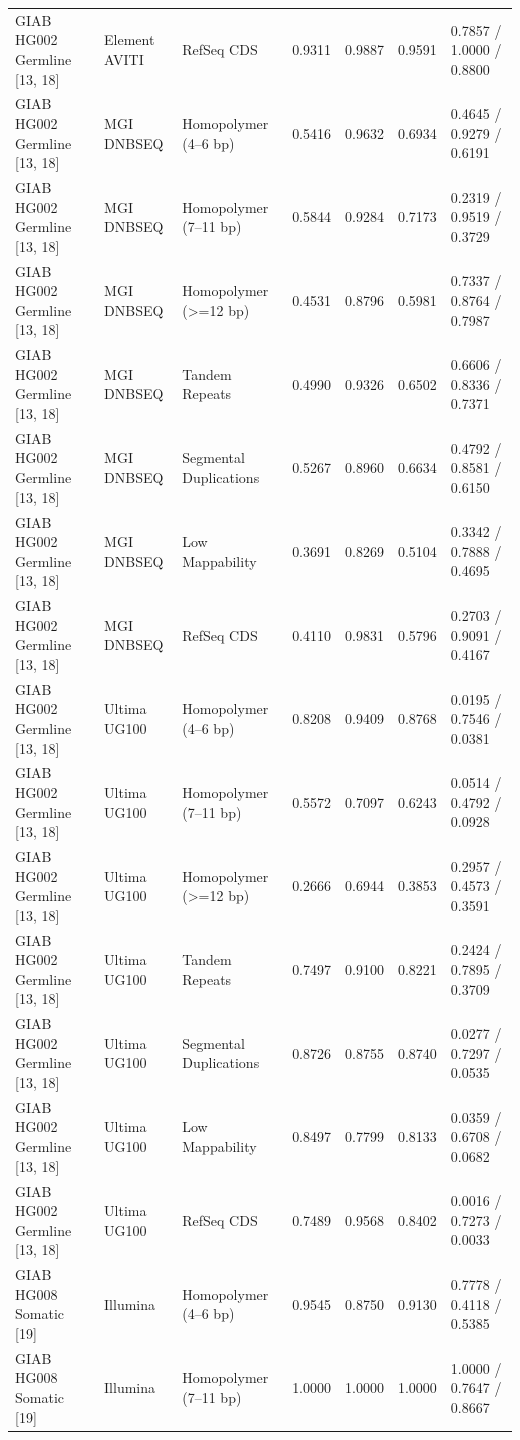\begin{table}[htbp]
{\begin{tabular}{lllllll}
GIAB HG002 Germline [13, 18] & Element AVITI & RefSeq CDS & 0.9311 & 0.9887 & 0.9591 & 0.7857 / 1.0000 / 0.8800 \\
GIAB HG002 Germline [13, 18] & MGI DNBSEQ & Homopolymer (4--6 bp) & 0.5416 & 0.9632 & 0.6934 & 0.4645 / 0.9279 / 0.6191 \\
GIAB HG002 Germline [13, 18] & MGI DNBSEQ & Homopolymer (7--11 bp) & 0.5844 & 0.9284 & 0.7173 & 0.2319 / 0.9519 / 0.3729 \\
GIAB HG002 Germline [13, 18] & MGI DNBSEQ & Homopolymer (\textgreater{}=12 bp) & 0.4531 & 0.8796 & 0.5981 & 0.7337 / 0.8764 / 0.7987 \\
GIAB HG002 Germline [13, 18] & MGI DNBSEQ & Tandem Repeats & 0.4990 & 0.9326 & 0.6502 & 0.6606 / 0.8336 / 0.7371 \\
GIAB HG002 Germline [13, 18] & MGI DNBSEQ & Segmental Duplications & 0.5267 & 0.8960 & 0.6634 & 0.4792 / 0.8581 / 0.6150 \\
GIAB HG002 Germline [13, 18] & MGI DNBSEQ & Low Mappability & 0.3691 & 0.8269 & 0.5104 & 0.3342 / 0.7888 / 0.4695 \\
GIAB HG002 Germline [13, 18] & MGI DNBSEQ & RefSeq CDS & 0.4110 & 0.9831 & 0.5796 & 0.2703 / 0.9091 / 0.4167 \\
GIAB HG002 Germline [13, 18] & Ultima UG100 & Homopolymer (4--6 bp) & 0.8208 & 0.9409 & 0.8768 & 0.0195 / 0.7546 / 0.0381 \\
GIAB HG002 Germline [13, 18] & Ultima UG100 & Homopolymer (7--11 bp) & 0.5572 & 0.7097 & 0.6243 & 0.0514 / 0.4792 / 0.0928 \\
GIAB HG002 Germline [13, 18] & Ultima UG100 & Homopolymer (\textgreater{}=12 bp) & 0.2666 & 0.6944 & 0.3853 & 0.2957 / 0.4573 / 0.3591 \\
GIAB HG002 Germline [13, 18] & Ultima UG100 & Tandem Repeats & 0.7497 & 0.9100 & 0.8221 & 0.2424 / 0.7895 / 0.3709 \\
GIAB HG002 Germline [13, 18] & Ultima UG100 & Segmental Duplications & 0.8726 & 0.8755 & 0.8740 & 0.0277 / 0.7297 / 0.0535 \\
GIAB HG002 Germline [13, 18] & Ultima UG100 & Low Mappability & 0.8497 & 0.7799 & 0.8133 & 0.0359 / 0.6708 / 0.0682 \\
GIAB HG002 Germline [13, 18] & Ultima UG100 & RefSeq CDS & 0.7489 & 0.9568 & 0.8402 & 0.0016 / 0.7273 / 0.0033 \\
GIAB HG008 Somatic [19] & Illumina & Homopolymer (4--6 bp) & 0.9545 & 0.8750 & 0.9130 & 0.7778 / 0.4118 / 0.5385 \\
GIAB HG008 Somatic [19] & Illumina & Homopolymer (7--11 bp) & 1.0000 & 1.0000 & 1.0000 & 1.0000 / 0.7647 / 0.8667 \\

\end{tabular}}
\end{table}
